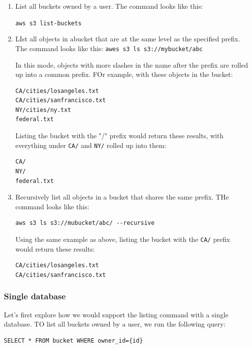 \documentclass{report}
\theoremstyle{definition}
\let\oldsubsubsection\subsubsection
\renewcommand{\subsubsection}{\oldsubsubsection*}
\begin{document}
\begin{enumerate}
\item
List all buckets owned by a user. The command looks like this:

\lstinline|aws s3 list-buckets|
\item
LIst all objects in  abucket that are at the same level as the specified prefix. The command looks like this:
\lstinline|awes s3 ls s3://mybucket/abc|

In this mode, objects with more slashes in the name after the prefix are rolled up into a common prefix. FOr example, with these objects in the bucket:

\begin{lstlisting}
CA/cities/losangeles.txt
CA/cities/sanfrancisco.txt
NY/cities/ny.txt
federal.txt
\end{lstlisting}

Listing the bucket with the "/" prefix would return these results, with everything under \lstinline|CA/| and \lstinline|NY/| rolled up into them:

\begin{lstlisting}
CA/
NY/
federal.txt
\end{lstlisting}
\item
Recursively list all objects in a bucket that shares the same prefix. THe command looks like this:

\begin{lstlisting}
aws s3 ls s3://mubucket/abc/ --recursive
\end{lstlisting}

Using the same example as above, listing the bucket with the \lstinline|CA/| prefix would return these results:

\begin{lstlisting}
CA/cities/losangeles.txt
CA/cities/sanfrancisco.txt
\end{lstlisting}
\end{enumerate}

\subsubsection{Single database}

Let's first explore how we would support the listing command with a single database. TO list all buckets owned by a user, we run the following query:

\begin{lstlisting}
SELECT * FROM bucket WHERE owner_id={id}
\end{lstlisting}
\end{document}
